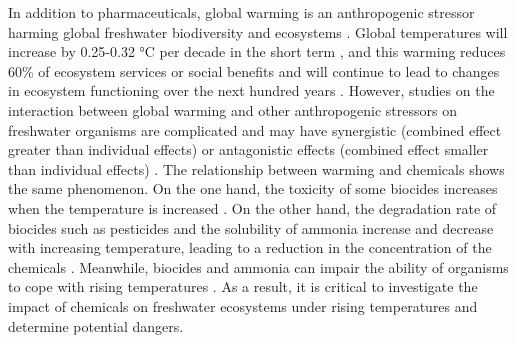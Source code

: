 \documentclass[11pt, a4paper]{article}
\begin{document}
\begin{spacing}{1.5}
In addition to pharmaceuticals, global warming is an anthropogenic stressor harming global freshwater biodiversity and ecosystems \citep{woodward2010climate}. Global temperatures will increase by 0.25-0.32 °C per decade in the short term \citep{smith2018predicted}, and this warming reduces 60\% of ecosystem services or social benefits \citep{mooney2009biodiversity} and will continue to lead to changes in ecosystem functioning over the next hundred years \citep{leducq2014local}. However, studies on the interaction between global warming and other anthropogenic stressors on freshwater organisms are complicated and may have synergistic (combined effect greater than individual effects) \citep{verberk2016field} or antagonistic effects (combined effect smaller than individual effects) \citep{jackson2016net}. The relationship between warming and chemicals shows the same phenomenon. On the one hand, the toxicity of some biocides increases when the temperature is increased \citep{jacobson2008combined, noyes2015forecasting}. On the other hand, the degradation rate of biocides such as pesticides and the solubility of ammonia increase and decrease with increasing temperature, leading to a reduction in the concentration of the chemicals \citep{kookana2010impact}. Meanwhile, biocides and ammonia can impair the ability of organisms to cope with rising temperatures \citep{hooper2013interactions, moe2013combined}. As a result, it is critical to investigate the impact of chemicals on freshwater ecosystems under rising temperatures and determine potential dangers.


\end{spacing}
\end{document}
